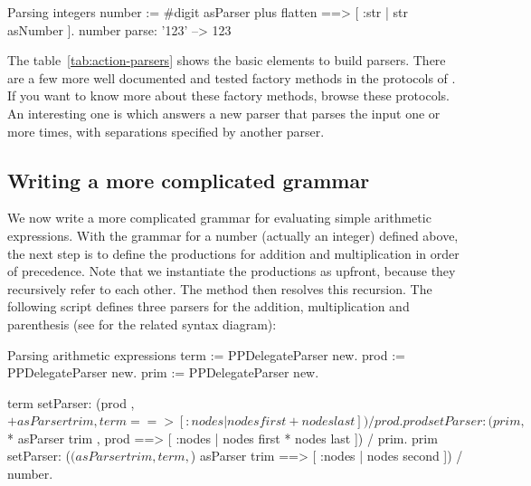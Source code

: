 \documentclass[a4paper,10pt,twoside]{book}
\begin{document}
\begin{script}[number]{Parsing integers}
number :=  #digit asParser plus flatten ==> [ :str | str asNumber ].
number parse: '123'                     --> 123
\end{script}


The table~\ref{tab:action-parsers} shows the basic elements to build
parsers. There are a few more well documented and tested factory
methods in the  protocols of . If you
want to know more about these factory methods, browse these protocols.
An interesting one is  which answers a new parser
that parses the input one or more times, with separations specified by
another parser.

\subsection{Writing a more complicated grammar}

We now write a more complicated grammar for evaluating simple
arithmetic expressions. With the grammar for a number (actually an
integer) defined above, the next step is to define the productions for
addition and multiplication in order of precedence. Note that we
instantiate the productions as  upfront,
because they recursively refer to each other. The method
 then resolves this recursion. The following script
defines three parsers for the addition, multiplication and parenthesis
(see  for the related syntax diagram):

\begin{script}[arithmetic]{Parsing arithmetic expressions}
term := PPDelegateParser new.
prod := PPDelegateParser new.
prim := PPDelegateParser new.

term setParser: (prod , $+ asParser trim , term ==> [ :nodes | nodes first + nodes last ])
                     / prod.
prod setParser: (prim , $* asParser trim , prod ==> [ :nodes | nodes first * nodes last ])
                     / prim.
prim setParser: ($( asParser trim , term , $) asParser trim ==> [ :nodes | nodes second ])
                     / number.
\end{script}
\end{document}
